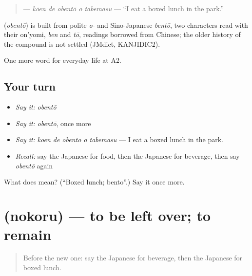 \begin{quote}
\textbf{  } — \emph{kōen de obentō o tabemasu} — \textquotedblleft{}I eat a boxed lunch in the park.\textquotedblright{}
\end{quote}

\begin{cousinweb}
\textbf{} (\emph{obentō}) is built from polite \emph{o-} and Sino-Japanese \emph{bentō}, two characters read with their on'yomi, \emph{ben} and \emph{tō}, readings borrowed from Chinese; the older history of the compound is not settled (JMdict, KANJIDIC2).
\end{cousinweb}

\begin{grammarlens}[title={What you've built}]
One more word for everyday life at A2.
\end{grammarlens}

\subsection*{Your turn}
\begin{itemize}
\raggedright
  \item \emph{Say it:} \emph{obentō}
  \item \emph{Say it:} \emph{obentō}, once more
  \item \emph{Say it:} \emph{kōen de obentō o tabemasu} — I eat a boxed lunch in the park.
  \item \emph{Recall:} say the Japanese for food, then the Japanese for beverage, then say \emph{obentō} again
\end{itemize}

\begin{tcolorbox}[breakable,colback=teal!4,colframe=teal!35!black,title={Before you move on}]
What does  mean? (\textquotedblleft{}Boxed lunch; bento\textquotedblright{}.) Say it once more.
\end{tcolorbox}
\section[\texorpdfstring{\ja{のこる} (nokoru)}{のこる (nokoru)}]{ (nokoru) — to be left over; to remain}

\label{lesson:JA-C173-nokoru}



\begin{quote}
Before the new one: say the Japanese for beverage, then the Japanese for boxed lunch.
\end{quote}

